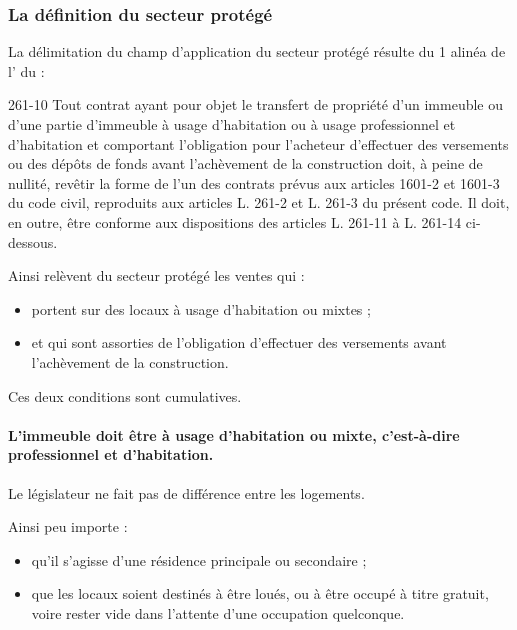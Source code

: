 		\subsubsection{La définition du secteur protégé}

			La délimitation du champ d’application du secteur protégé résulte du 1\ier{} alinéa de l' du \cch :

			\begin{citationArticle}[L]{261-10}{\cch}
				Tout contrat ayant pour objet le transfert de propriété d'un immeuble ou d'une partie d'immeuble à usage d'habitation ou à usage professionnel et d'habitation et comportant l'obligation pour l'acheteur d'effectuer des versements ou des dépôts de fonds avant l'achèvement de la construction doit, à peine de nullité, revêtir la forme de l'un des contrats prévus aux articles 1601-2 et 1601-3 du code civil, reproduits aux articles L. 261-2 et L. 261-3 du présent code. Il doit, en outre, être conforme aux dispositions des articles L. 261-11 à L. 261-14 ci-dessous.
			\end{citationArticle}

			Ainsi relèvent du secteur protégé les ventes qui :
			\begin{itemize}
				\item portent sur des locaux à usage d'habitation ou mixtes ;
				\item et qui sont assorties de l'obligation d'effectuer des versements avant l'achèvement de la construction.
			\end{itemize}

			Ces deux conditions sont cumulatives.


			\paragraph{L’immeuble doit être à usage d’habitation ou mixte, c'est-à-dire professionnel et d’habitation.}

			Le législateur ne fait pas de différence entre les logements.

			Ainsi peu importe :
			\begin{itemize}
				\item qu’il s’agisse d’une résidence principale ou secondaire ;
				\item que les locaux soient destinés à être loués, ou à être occupé à titre gratuit, voire rester vide dans l’attente d’une occupation quelconque.
			\end{itemize}

